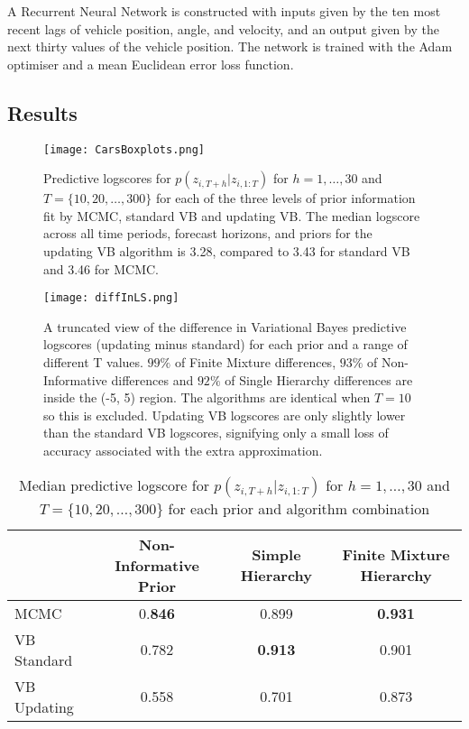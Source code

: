\documentclass[12pt,a4paper]{article}\usepackage[]{graphicx}\usepackage[]{color}
\begin{document}
A Recurrent Neural Network is constructed with inputs given by the ten most recent lags of vehicle position, angle, and velocity, and an output given by the next thirty values of the vehicle position. The network is trained with the Adam optimiser and a mean Euclidean error loss function. 
\subsection{Results}

\begin{figure}[ht]
\centering
\texttt{[image: CarsBoxplots.png]}
\caption{Predictive logscores for $p(z_{i, T+h} | z_{i, 1:T})$ for $h = 1, \dots, 30$ and $T = \{10, 20, \dots, 300\}$ for each of the three levels of prior information fit by MCMC, standard VB and updating VB. The median logscore across all time periods, forecast horizons, and priors for the updating VB algorithm is 3.28, compared to 3.43 for standard VB and 3.46 for MCMC.}
\label{fig:MainResults}
\end{figure}

\begin{figure}[ht]
\centering
\texttt{[image: diffInLS.png]}
\caption{A truncated view of the difference in Variational Bayes predictive logscores (updating minus standard) for each prior and a range of different T values. $99\%$ of Finite Mixture differences, $93\%$ of Non-Informative differences and $92\%$ of Single Hierarchy differences are inside the (-5, 5) region. The algorithms are identical when $T = 10$ so this is excluded. Updating VB logscores are only slightly lower than the standard VB logscores, signifying only a small loss of accuracy associated with the extra approximation.}
\label{fig:diffInLS}
\end{figure}

\begin{center}
\begin{table}[h]
\begin{tabular}{| l | c | c | c |}
\hline
& Non-Informative Prior & Simple Hierarchy & Finite Mixture Hierarchy \\
\hline
MCMC & 0.\textbf{846} & 0.899 & \textbf{0.931} \\
VB Standard & 0.782 & \textbf{0.913} & 0.901 \\
VB Updating & 0.558 & 0.701 & 0.873 \\
\hline
\end{tabular}
\label{tableMedian}
\caption{Median predictive logscore for $p(z_{i, T+h} | z_{i, 1:T})$ for $h = 1, \dots, 30$ and $T = \{10, 20, \dots, 300\}$ for each prior and algorithm combination}
\end{table}
\end{center}
\end{document}
